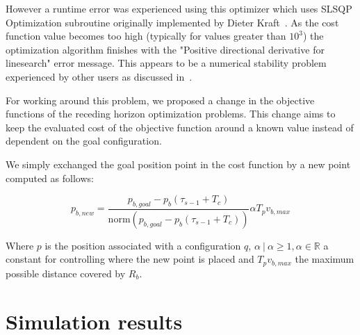 \documentclass[eprint]{actapoly}
\begin{document}
However a runtime error was experienced using this optimizer which uses SLSQP 
Optimization subroutine originally implemented by Dieter Kraft~\cite{Kraft1988}.
As the cost function value becomes too high (typically for values greater than 
$10^3$) the optimization algorithm finishes with the "Positive 
directional derivative for linesearch" error message. This appears to be
a numerical stability problem experienced by other users as discussed in~\cite{slsqperror}.

For working around this problem, we proposed a change in the objective functions
of the receding horizon optimization problems. This change aims to keep the 
evaluated cost of the objective function around a known value instead of 
dependent on the goal configuration.

We simply exchanged the goal position point in the cost function by a new point computed as follows:

$$
    p_{b,new} = \frac{p_{b,goal} - p_{b}(\tau_{s-1}+T_c) }{\mathrm{norm}(p_{b,goal} - p_{b}(\tau_{s-1}+T_c) )} \alpha T_pv_{b,max}
$$

Where $p$ is the position associated with a configuration $q$, $\alpha\ |\ 
\alpha \geq 1, \alpha \in \mathbb{R}$ a constant for controlling where the
new point is placed and $T_pv_{b,max}$ the maximum possible distance covered by $R_b$.









\section{Simulation results}
\end{document}
